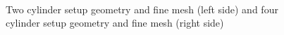\begin{figure}[h]
\begin{subfigure}{0.24\textwidth}
          \end{subfigure}\hfill
        \begin{subfigure}{0.24\textwidth}
                \flushright
        \end{subfigure}
        \\
        
        \caption[Two cylinder and four cylinder setup]{Two cylinder setup geometry and fine mesh (left side) and four cylinder setup geometry and fine mesh (right side)}
        \label{fig:Two_Four_Wires}
  \end{figure}
  
